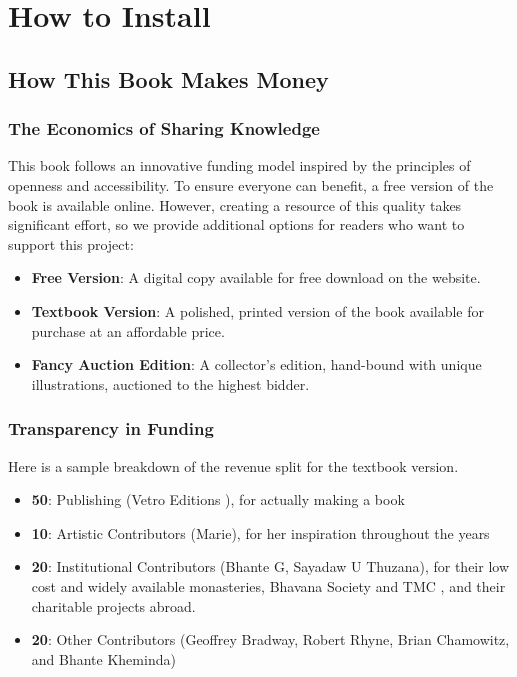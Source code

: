 \chapter{How to Install}

\section{How This Book Makes Money}
\subsection{The Economics of Sharing Knowledge}
This book follows an innovative funding model inspired by the principles of openness and accessibility. To ensure everyone can benefit, a free version of the book is available online. However, creating a resource of this quality takes significant effort, so we provide additional options for readers who want to support this project:

\begin{itemize}
\item \textbf{Free Version}: A digital copy available for free download on the website.
\item \textbf{Textbook Version}: A polished, printed version of the book available for purchase at an affordable price.
\item \textbf{Fancy Auction Edition}: A collector\textquoteright s edition, hand-bound with unique illustrations, auctioned to the highest bidder.
\end{itemize}

\subsection{Transparency in Funding}
Here is a sample breakdown of the revenue split for the textbook version.
\begin{itemize}
\item \textbf{50}: Publishing (Vetro Editions \cite{vetro}), for actually making a book
\item \textbf{10}: Artistic Contributors (Marie), for her inspiration throughout the years
\item \textbf{20}: Institutional Contributors (Bhante G, Sayadaw U Thuzana), for their low cost and widely available monasteries, Bhavana Society \cite{bhavana} and TMC \cite{tmc}, and their charitable projects abroad.
\item \textbf{20}: Other Contributors (Geoffrey Bradway, Robert Rhyne, Brian Chamowitz, and Bhante Kheminda)

\end{itemize}

